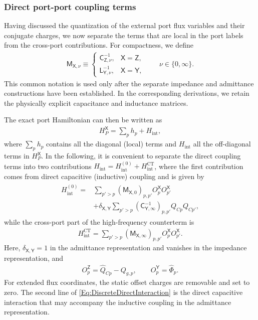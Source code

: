 \documentclass[prx,aps,twocolumn,article]{revtex4-2}
\newcommand{\msf}[1]{\mathsf{#1}}
\newcommand{\msY}{\msf{Y}}
\newcommand{\msZ}{\msf{Z}}
\newcommand{\msL}{\msf{L}}
\newcommand{\msC}{\msf{C}}
\newcommand{\msM}{\msf{M}}
\newcommand{\msX}{\msf{X}}
\begin{document}
\subsubsection{Direct port-port coupling terms} \label{Sec:MaintDirectCoupling}

Having discussed the quantization of the external port flux variables and their conjugate charges, we now separate the terms that are local in the port labels from the cross-port contributions. For compactness, we define
\begin{align}
    \msM_{\msX,\nu}
    \equiv
    \begin{cases}
        \msC_{\msZ,\nu}^{-1}, & \msX=\msZ,\\[1mm]
        \msL_{\msY,\nu}^{-1}, & \msX=\msY,
    \end{cases}
    \qquad
    \nu\in\{0,\infty\}.
\label{Eq:DiscreteA0AinfDefinitions}
\end{align}
This common notation is used only after the separate impedance and admittance constructions have been established. In the corresponding derivations, we retain the physically explicit capacitance and inductance matrices.

The exact port Hamiltonian can then be written as
\begin{align}
    H_P^{\msX}
    =
    \sum_p h_p+H_{\mathrm{int}},
    \label{Eq:PortHamiltonianSplitUp}
\end{align}
where $\sum_p h_p$ contains all the diagonal (local) terms and $H_{\mathrm{int}}$ all the off-diagonal terms in $H_P^{\msX}$. In the following, it is convenient to separate the direct coupling terms into two contributions $H_{\mathrm{int}}
=H_{\mathrm{int}}^{(0)}+H_{\mathrm{int}}^{\mathrm{CT}}$, where the first contribution comes from direct capacitive (inductive) coupling and is given by
\begin{align}
\begin{aligned}
    H_{\mathrm{int}}^{(0)}
    ={}&
    \sum_{p'>p}
    \left(\msM_{\msX,0}\right)_{p,p'}
    O_{p}^{\msX} O_{p'}^{\msX}
    \\
    &+
    \delta_{\msX,\msY}
    \sum_{p'>p}
    \left(
        \msC_{\msY,\infty}^{-1}
    \right)_{p,p'}
    Q_{Cp}Q_{Cp'},
\end{aligned}
\label{Eq:DiscreteDirectInteraction}
\end{align}
while the cross-port part of the high-frequency counterterm is
\begin{align}
    H_{\mathrm{int}}^{\mathrm{CT}}
    =
    \sum_{p'>p}
    \left(\msM_{\msX,\infty}\right)_{p,p'}
    O_{p}^{\msX} O_{p'}^{\msX}.
\label{Eq:DiscreteDirectInteractionCounterTerm}
\end{align}
Here, $\delta_{\msX,\msY}=1$ in the admittance representation and vanishes in the impedance representation, and
\begin{align}
    O_{p}^{\msZ}=\hat Q_{Cp}-Q_{g,p},
    \qquad
    O_{p}^{\msY}=\hat\Phi_p.
    \label{Eq:CouplingOperatorDefMain}
\end{align}
For extended flux coordinates, the static offset charges are removable and set to zero. The second line of \cref{Eq:DiscreteDirectInteraction} is the direct capacitive interaction that may accompany the inductive coupling in the admittance representation.
\end{document}
